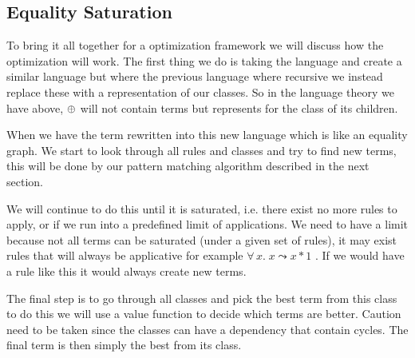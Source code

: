 \subsection{Equality Saturation}
To bring it all together for a optimization framework we will discuss how the optimization
will work. The first thing we do is taking the language and create a similar language
but where the previous language where recursive we instead replace these with a
representation of our classes. So in the language theory we have above, $\oplus$ will
not contain terms but represents for the class of its children.

When we have the term rewritten into this new language which is like an equality
graph. We start to look through all rules and classes and try to find new terms,
this will be done by our pattern matching algorithm described in the next section.

We will continue to do this until it is saturated, i.e. there exist no more rules
to apply, or if we run into a predefined limit of applications. We need to have a
limit because not all terms can be saturated (under a given set of rules), it may
exist rules that will always be applicative for example $\forall \,x. \; x \leadsto x * 1$
. If we would have a rule like this it would always create new terms.

The final step is to go through all classes and pick the best term from this class
to do this we will use a value function to decide which terms are better. Caution
need to be taken since the classes can have a dependency that contain cycles. The
final term is then simply the best from its class.



